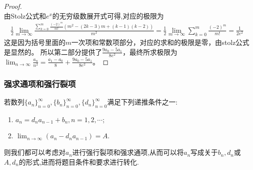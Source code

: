 \documentclass[lang=cn,newtx,10pt,scheme=chinese]{elegantbook}
\begin{document}
\begin{proof}
\[\]
由Stolz公式和$e^x$的无穷级数展开式可得,对应的极限为
\begin{align*}
\frac{1}{2}\lim_{m\rightarrow\infty}\frac{\sum_{k = 0}^{m}\frac{(-2)^m}{m!}(m^2-(2k - 3)m+(k - 1)(k - 2))}{m^2}
=\frac{1}{2}\lim_{m\rightarrow\infty}\sum_{k = 0}^{m}\frac{(-2)^m}{m!}=\frac{1}{2e^2}
\end{align*}
这是因为括号里面的\(m\)一次项和常数项部分，对应的求和的极限是零，由stolz公式是显然的。
所以第二部分提供了\(\frac{9a_0 - 5a_1}{8e^2}\)，最终所求极限为\(\lim_{n\rightarrow\infty}\frac{a_n}{n^2}=\frac{a_1 - a_0}{8}+\frac{9a_0 - 5a_1}{8e^2}\)。
\end{proof}





\subsubsection{强求通项和强行裂项}

若数列\(\{ a_n \}_{n = 0}^{\infty}, \{ b_n \}_{n = 0}^{\infty}, \{ d_n \}_{n = 0}^{\infty}\)满足下列递推条件之一:
\begin{enumerate}
\item \(a_n = d_na_{n - 1} + b_n, n = 1, 2, \cdots\);
\item \(\lim_{n\rightarrow \infty}(a_n - d_na_{n - 1}) = A\).
\end{enumerate}
则我们都可以考虑对\(a_n\)进行强行裂项和强求通项,从而可以将\(a_n\)写成关于\(b_n, d_n\)或\(A, d_n\)的形式,进而将题目条件和要求进行转化.
\end{document}

